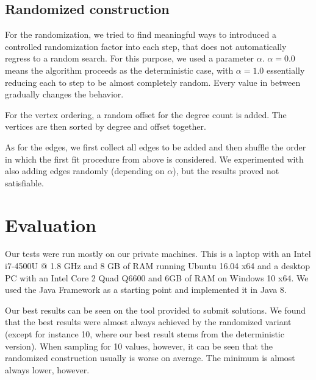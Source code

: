 \documentclass [11pt]{article}
\begin{document}
\subsection{Randomized construction}
For the randomization, we tried to find meaningful ways to introduced a controlled randomization factor into each step, that does not automatically regress to a random search. For this purpose, we used a parameter $\alpha$. $\alpha = 0.0$  means the algorithm proceeds as the deterministic case, with $\alpha = 1.0$ essentially reducing each to step to be almost completely random. Every value in between gradually changes the behavior. 

For the vertex ordering, a random offset for the degree count is added. The vertices are then sorted by degree and offset together. 

As for the edges, we first collect all edges to be added and then shuffle the order in which the first fit procedure from above is considered. We experimented with also adding edges randomly (depending on $\alpha$), but the results proved not satisfiable. 

\section{Evaluation}
Our tests were run mostly on our private machines. This is a laptop with an Intel i7-4500U @ 1.8 GHz and 8 GB of RAM running Ubuntu  16.04 x64  and a desktop PC with an Intel Core 2 Quad Q6600 and 6GB of RAM on Windows 10 x64. We used the Java Framework as a starting point and implemented it in Java 8. 

Our best results can be seen on the tool provided to submit solutions. We found that the best results were almost always achieved by the randomized variant (except for instance 10, where our best result stems from the deterministic version). When sampling for 10 values, however, it can be seen that the randomized construction usually is worse on average. The minimum is almost always lower, however.
\end{document}
